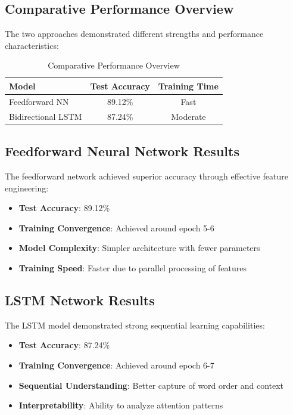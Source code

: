 \documentclass[a4paper, journal]{IEEEtran}
\begin{document}
\subsection{Comparative Performance Overview}

The two approaches demonstrated different strengths and performance characteristics:

\begin{table}[ht]
\centering
\caption{Comparative Performance Overview}
\begin{tabular}{@{}lcc@{}}
\toprule
\textbf{Model} & \textbf{Test Accuracy} & \textbf{Training Time} \\
\midrule
Feedforward NN & 89.12\% & Fast \\
Bidirectional LSTM & 87.24\% & Moderate \\
\bottomrule
\end{tabular}
\label{tab:comparison}
\end{table}

\subsection{Feedforward Neural Network Results}

The feedforward network achieved superior accuracy through effective feature engineering:

\begin{itemize}
    \item \textbf{Test Accuracy}: 89.12\%
    \item \textbf{Training Convergence}: Achieved around epoch 5-6
    \item \textbf{Model Complexity}: Simpler architecture with fewer parameters
    \item \textbf{Training Speed}: Faster due to parallel processing of features
\end{itemize}

\subsection{LSTM Network Results}

The LSTM model demonstrated strong sequential learning capabilities:

\begin{itemize}
    \item \textbf{Test Accuracy}: 87.24\%
    \item \textbf{Training Convergence}: Achieved around epoch 6-7
    \item \textbf{Sequential Understanding}: Better capture of word order and context
    \item \textbf{Interpretability}: Ability to analyze attention patterns
\end{itemize}
\end{document}
